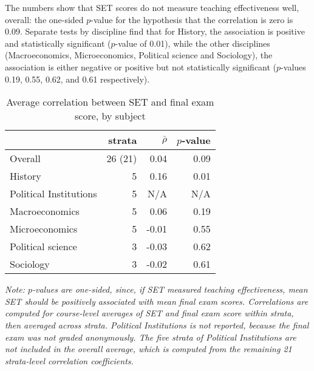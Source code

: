 \documentclass[12pt]{article}
\begin{document}
The numbers show that SET scores do not measure teaching effectiveness well, overall:
the one-sided $p$-value for the hypothesis that the correlation is zero is 0.09.
Separate tests by discipline find that for History, the 
association is positive and statistically
significant ($p$-value of 0.01),
while the other disciplines (Macroeconomics, Microeconomics, Political science and Sociology), 
the association is either negative or positive but not statistically significant 
($p$-values 0.19, 0.55, 0.62, and 0.61 respectively). 

\begin{table}[htbp]
  \centering
  \footnotesize 
  \caption{Average correlation between SET and final exam score, by subject}
    \begin{tabular}{lrrr}
    \toprule 
                        & strata & $\bar{\rho}$  & $p$-value  \\
   \midrule
    Overall &        26 (21) &     0.04 &       0.09  \\
    History &         5 &    0.16 &       0.01  \\
    Political Institutions & 5 & N/A & N/A \\
    Macroeconomics &  5 &    0.06 &       0.19  \\
    Microeconomics &   5 &   -0.01 &       0.55  \\
    Political science & 3 &  -0.03 &       0.62  \\
    Sociology &      3 &    -0.02 &       0.61  \\
    \bottomrule
    \end{tabular}%
 \label{tab:finalexam}%
 
\textit{Note: $p$-values are one-sided, since, if SET measured teaching
effectiveness,  mean SET should be positively associated
with mean final exam scores.
Correlations are computed for course-level averages of SET and final exam score
within strata, then averaged across strata.
Political Institutions is not reported, because the final exam was not graded anonymously.
The five strata of Political Institutions are not included in the overall average,
which is computed from the remaining 21 strata-level correlation coefficients.}
\end{table}%
\normalsize
\end{document}
